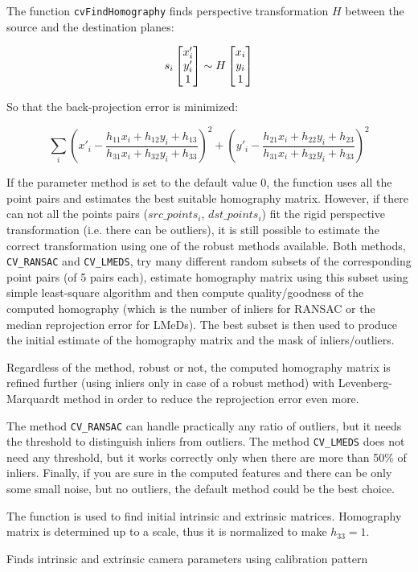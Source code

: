 The function \texttt{cvFindHomography} finds perspective transformation $H$ between the source and the destination planes:

\[
s_i \begin{bmatrix} x'_i\\ y'_i\\ 1 \end{bmatrix} \sim H \begin{bmatrix} x_i\\ y_i\\ 1 \end{bmatrix}
\]

So that the back-projection error is minimized:

\[
\sum_i
\left( x'_i-\frac{h_{11} x_i + h_{12} y_i + h_{13}}{h_{31} x_i + h_{32} y_i + h_{33}} \right)^2+
\left( y'_i-\frac{h_{21} x_i + h_{22} y_i + h_{23}}{h_{31} x_i + h_{32} y_i + h_{33}} \right)^2
\]

If the parameter method is set to the default value 0, the function
uses all the point pairs and estimates the best suitable homography
matrix. However, if there can not all the points pairs ($src\_points_i$,
$dst\_points_i$) fit the rigid perspective transformation (i.e. there
can be outliers), it is still possible to estimate the correct
transformation using one of the robust methods available. Both
methods, \texttt{CV\_RANSAC} and \texttt{CV\_LMEDS}, try many different random subsets
of the corresponding point pairs (of 5 pairs each), estimate
homography matrix using this subset using simple least-square
algorithm and then compute quality/goodness of the computed homography
(which is the number of inliers for RANSAC or the median reprojection
error for LMeDs). The best subset is then used to produce the initial
estimate of the homography matrix and the mask of inliers/outliers.

Regardless of the method, robust or not, the computed homography
matrix is refined further (using inliers only in case of a robust
method) with Levenberg-Marquardt method in order to reduce the
reprojection error even more.

The method \texttt{CV\_RANSAC} can handle practically any ratio of outliers,
but it needs the threshold to distinguish inliers from outliers.
The method \texttt{CV\_LMEDS} does not need any threshold, but it works
correctly only when there are more than 50\% of inliers. Finally,
if you are sure in the computed features and there can be only some
small noise, but no outliers, the default method could be the best
choice.

The function is used to find initial intrinsic and extrinsic matrices.
Homography matrix is determined up to a scale, thus it is normalized
to make $h_{33}=1$.

\label{CalibrateCamera2}

Finds intrinsic and extrinsic camera parameters using calibration pattern

